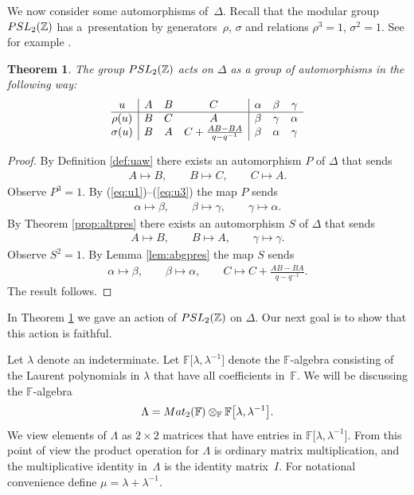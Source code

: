 \documentclass[10pt,a4paper]{amsart}
\numberwithin{equation}{section}
\newtheorem{Theorem}{Theorem}[section]
\begin{document}
We now consider
some automorphisms of~$\Delta $.
Recall that the modular group
${\rm  {PSL}}_2(\mathbb Z)$ has a~presentation
by generators~$\rho$, $\sigma$ and
relations $\rho^3=1$, $\sigma^2=1$.
See for example \cite{alpern}.


\begin{Theorem}
\label{thm:try}
The group
${\rm  {PSL}}_2(\mathbb Z)$ acts on
$\Delta $ as a group of automorphisms in the following way:
\[
\begin{array}{@{}c| ccc | c c c}
u &  A & B  & C
&  \alpha & \beta  & \gamma
\\
\hline
\rho(u) &  B & C & A
&  \beta  & \gamma & \alpha
\\
\sigma(u) &  B & A & C+\frac{AB-BA}{q-q^{-1}}
&  \beta & \alpha & \gamma
\end{array}
\]
\end{Theorem}

\begin{proof}
By Def\/inition
\ref{def:uaw} there exists an automorphism
$P$ of $\Delta $ that sends
\begin{gather*}
A \mapsto B,
\qquad
B \mapsto C,
\qquad
C \mapsto A.
\end{gather*}
Observe $P^3=1$. By
(\ref{eq:u1})--(\ref{eq:u3})
the map $P$ sends
\begin{gather*}
\alpha \mapsto \beta,
\qquad
\beta \mapsto \gamma,
\qquad
\gamma \mapsto \alpha.
\end{gather*}
By Theorem
\ref{prop:altpres} there exists
an automorphism
$S$ of $\Delta $ that sends
\begin{gather*}
A \mapsto B,
 \qquad
B \mapsto A,
\qquad
\gamma \mapsto \gamma.
\end{gather*}
Observe $S^2=1$. By
Lemma
\ref{lem:abgpres}
the map $S$
sends
\begin{gather*}
\alpha \mapsto \beta,
\qquad
\beta \mapsto \alpha,
\qquad
C \mapsto C + \frac{AB-BA}{q-q^{-1}}.
\end{gather*}
The result follows.
\end{proof}


In Theorem
\ref{thm:try}
we gave an
 action of ${\rm  {PSL}}_2(\mathbb Z)$  on $\Delta $.
Our next goal is to show that this
action is faithful.

Let $\lambda $ denote an indeterminate.
Let $\mathbb F\lbrack \lambda,\lambda^{-1}\rbrack$
denote the $\mathbb F$-algebra consisting of the Laurent
polynomials in $\lambda$ that have all coef\/f\/icients
in~$\mathbb F$.
We will be discussing the $\mathbb F$-algebra
\begin{gather*}
\Lambda ={\rm {Mat}}_2(\mathbb F) \otimes_{\mathbb F} \mathbb F\big\lbrack \lambda, \lambda^{-1}\big\rbrack.
\end{gather*}
We view elements of $\Lambda $ as $2\times 2$ matrices that have entries
in
$\mathbb F\lbrack \lambda, \lambda^{-1}\rbrack $.
From this point of view the product operation
for $\Lambda $ is ordinary matrix multiplication,
and the multiplicative identity in~$\Lambda $
is the identity matrix~$I$.
For notational convenience def\/ine
$\mu = \lambda + \lambda^{-1}$.
\end{document}
